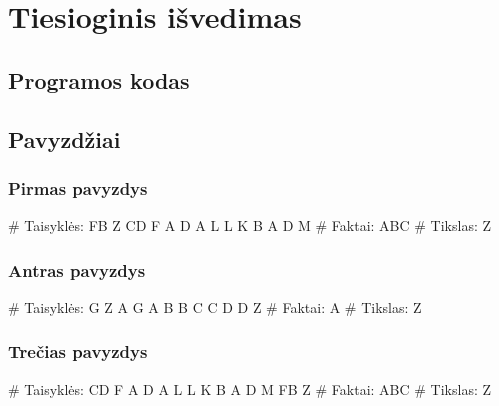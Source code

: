 \chapter{Tiesioginis išvedimas}

\section{Programos kodas}


\section{Pavyzdžiai}

\subsection{Pirmas pavyzdys}

\begin{pythonaienv}[fc]
# Taisyklės:
FB Z
CD F
A D
A L
L K
B A
D M
# Faktai:
ABC
# Tikslas:
Z
\end{pythonaienv}

\subsection{Antras pavyzdys}

\begin{pythonaienv}[fc]
# Taisyklės:
G Z
A G
A B
B C
C D
D Z
# Faktai:
A
# Tikslas:
Z
\end{pythonaienv}

\subsection{Trečias pavyzdys}

\begin{pythonaienv}[fc]
# Taisyklės:
CD F
A D
A L
L K
B A
D M
FB Z
# Faktai:
ABC
# Tikslas:
Z
\end{pythonaienv}
